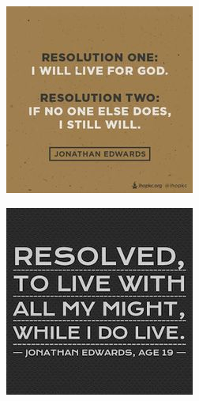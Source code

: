 \begin{frame}[label=sec-2-6]{}
\includegraphics[width=.9\linewidth]{./img/resolution-edwards.jpg}
\end{frame}

\begin{frame}[label=sec-2-7]{}
\includegraphics[width=.9\linewidth]{./img/resolved-to-live.jpg}
\end{frame}

